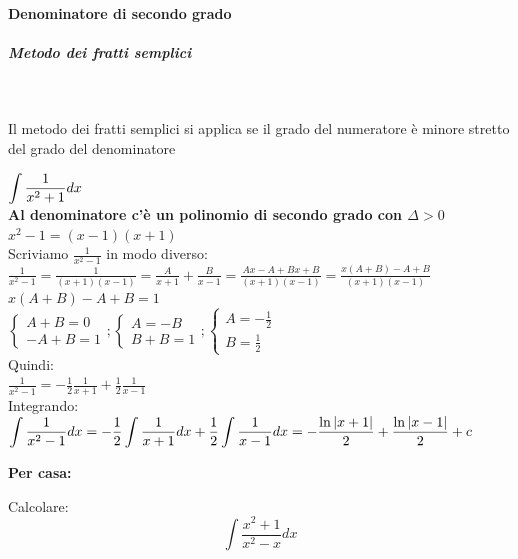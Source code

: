 \documentclass[12pt]{report}
\begin{document}
		\paragraph{Denominatore di secondo grado}
		\subparagraph{Metodo dei fratti semplici} \quad \\
		\begin{note}{}{}
			Il metodo dei fratti semplici si applica se il grado del numeratore è minore stretto del grado del denominatore
		\end{note}
		\begin{example}{}{}
			$\mathlarger{\int \frac{1}{x^2 + 1}dx}$ \\
			\textbf{Al denominatore c'è un polinomio di secondo grado con $\Delta > 0$} \\
			$x^2 - 1 = (x-1)(x+1)$ \\
			Scriviamo $\frac{1}{x^2 - 1}$ in modo diverso: $\frac{1}{x^2-1} = \frac{1}{(x+1)(x-1)} = \frac{A}{x+1} + \frac{B}{x-1} = \frac{Ax - A + Bx + B}{(x+1)(x-1)} = \frac{x(A + B)-A + B}{(x+1)(x-1)}$ \\
			$x(A+B) - A + B = 1$ \\
			$\begin{cases}
				A + B = 0 \\
				-A + B = 1
			\end{cases} ; \begin{cases}
				A = -B \\
				B + B = 1
			\end{cases}; \begin{cases}
				A = -\frac{1}{2} \\
				B = \frac{1}{2}
			\end{cases}$ \\
			Quindi: \\
			$\frac{1}{x^2 - 1} = -\frac{1}{2}\frac{1}{x+1} + \frac{1}{2}\frac{1}{x-1}$ \\
			Integrando: \\
			$\mathlarger{\int \frac{1}{x^2-1}dx = -\frac{1}{2}\int\frac{1}{x+1}dx + \frac{1}{2}\int \frac{1}{x-1}dx = -\frac{\ln |x+1|}{2} + \frac{\ln |x-1|}{2} + c}$
		\end{example}
		\textbf{Per casa:}
		\begin{assignment}{}{}
			Calcolare:
			\[
			\int \frac{x^2+1}{x^2 -x}dx
			\]
		\end{assignment}
\end{document}
